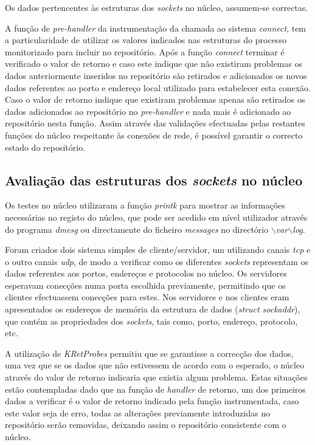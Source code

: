 Os dados pertencentes às estruturas dos \textit{sockets} no núcleo, assumem-se correctas.

A função de \textit{pre-handler} da instrumentação da chamada ao sistema \textit{connect}, tem a particularidade de utilizar os valores indicados nas estruturas do processo monitorizado para incluir no repositório.
Após a função \textit{connect} terminar é verificado o valor de retorno e caso este indique que não existiram problemas os dados anteriormente inseridos no repositório são retirados e adicionados os novos dados referentes ao porto e endereço local utilizado para estabelecer esta conexão.
Caso o valor de retorno indique que existiram problemas apenas são retirados os dados adicionados ao repositório no \textit{pre-handler} e nada mais é adicionado ao repositório nesta função.
Assim através das validações efectuadas pelas restantes funções do núcleo respeitante às conexões de rede, é possível garantir o correcto estado do repositório.

\subsection{Avaliação das estruturas dos \textit{sockets} no núcleo}

Os testes no núcleo utilizaram a função \textit{printk} para mostrar as informações necessárias no registo do núcleo, que pode ser acedido em nível utilizador através do programa \textit{dmesg} ou directamente do ficheiro \textit{messages} no directório $\backslash$\textit{var}$\backslash$\textit{log}.

Foram criados dois sistema simples de cliente/servidor, um utilizando canais \textit{tcp} e o outro canais \textit{udp}, de modo a verificar como os diferentes \textit{sockets} representam os dados referentes aos portos, endereços e protocolos no núcleo.
Os servidores esperavam conecções numa porta escolhida previamente, permitindo que os clientes efectuassem conecções para estes.
Nos servidores e nos clientes eram apresentados os endereços de memória da estrutura de dados (\textit{struct sockaddr}), que contém as propriedades dos \textit{sockets}, tais como, porto, endereço, protocolo, etc.

A utilização de \textit{KRetProbes} permitiu que se garantisse a correcção dos dados, uma vez que se os dados que não estivessem de acordo com o esperado, o núcleo através do valor de retorno indicaria que existia algum problema.
Estas situações estão contempladas dado que na função de \textit{handler} de retorno, um dos primeiros dados a verificar é o valor de retorno indicado pela função instrumentada, caso este valor seja de erro, todas as alterações previamente introduzidas no repositório serão removidas, deixando assim o repositório consistente com o núcleo.

